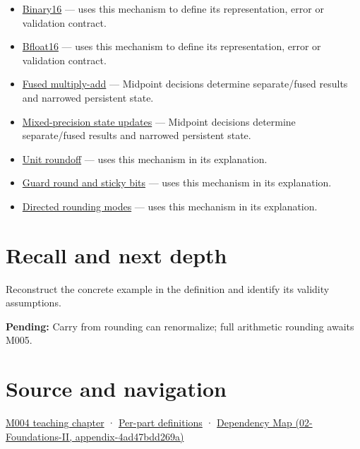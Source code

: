 \begin{itemize}
\item
  \hyperref[appendix-34443cec7170]{Binary16} --- uses this mechanism to define its representation, error or validation contract.
\item
  \hyperref[appendix-18b8dd966b5d]{Bfloat16} --- uses this mechanism to define its representation, error or validation contract.
\item
  \hyperref[appendix-41e8ef22a21e]{Fused multiply-add} --- Midpoint decisions determine separate/fused results and narrowed persistent state.
\item
  \hyperref[appendix-260182e617b7]{Mixed-precision state updates} --- Midpoint decisions determine separate/fused results and narrowed persistent state.
\item
  \hyperref[appendix-bc44f7b42f42]{Unit roundoff} --- uses this mechanism in its explanation.
\item
  \hyperref[appendix-b572b631069b]{Guard round and sticky bits} --- uses this mechanism in its explanation.
\item
  \hyperref[appendix-637d164ae5ca]{Directed rounding modes} --- uses this mechanism in its explanation.
\end{itemize}

\section{Recall and next depth}\label{appendix-614afe1de592-recall-and-next-depth}

Reconstruct the concrete example in the definition and identify its validity assumptions.

\textbf{Pending:} Carry from rounding can renormalize; full arithmetic rounding awaits M005.

\section{Source and navigation}\label{appendix-614afe1de592-source-and-navigation}

\href{Continuous\%20Notes/Computing\%20Foundations\%20-\%20From\%20Bits\%20to\%20C++\%20and\%20Systems\%20APIs\#A\%20stretching\%20ruler\%20for\%20real-valued\%20quantities}{M004 teaching chapter} · \hyperref[appendix-fd090d982a15-m004---parts-61-76]{Per-part definitions} · \href{../02-Foundations-II/main.pdf\#nameddest=appendix-4ad47bdd269a}{Dependency Map (02-Foundations-II, appendix-4ad47bdd269a)}
